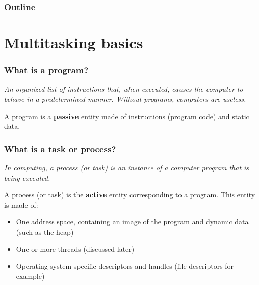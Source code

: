 %
%



%
%

\begin{frame}
  \titlepage

  \begin{center}
    \logos
  \end{center}
\end{frame}

%
%

\begin{frame}
  \frametitle{Outline}
  \tableofcontents
\end{frame}

%
%

\section{Multitasking basics}


\begin{frame}
  \frametitle{What is a program?}

  \emph{An organized list of instructions that, when executed, causes
  the computer to behave in a predetermined manner. Without programs,
  computers are useless.}

  \-

  A program is a \textbf{passive} entity made of instructions (program
  code) and static data.

\end{frame}


\begin{frame}
  \frametitle{What is a task or process?}

  \emph{In computing, a process (or task) is an instance of a computer
  program that is being executed.}

  \-

  A process (or task) is the \textbf{active} entity corresponding to a
  program. This entity is made of:

  \begin{itemize}
  \item
    One address space, containing an image of the program and dynamic
    data (such as the heap)
  \item
    One or more threads (discussed later)
  \item
    Operating system specific descriptors and handles (file
    descriptors for example)
  \end{itemize}

\end{frame}


